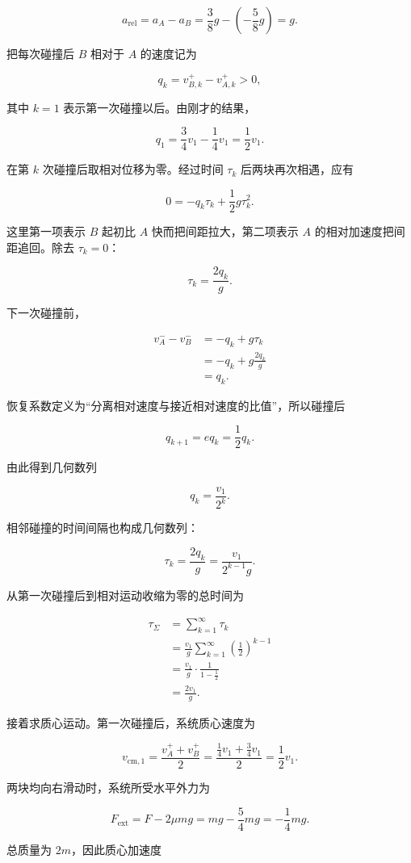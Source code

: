 \documentclass[12pt,a4paper,UTF8]{ctexart}
\begin{document}
\[a_{\mathrm{rel}}=a_A-a_B
=\frac38g-\left(-\frac58g\right)=g.\]

把每次碰撞后 \(B\) 相对于 \(A\) 的速度记为

\[q_k=v_{B,k}^+-v_{A,k}^+>0,\]

其中 \(k=1\) 表示第一次碰撞以后。由刚才的结果，

\[q_1=\frac34v_1-\frac14v_1=\frac12v_1.\]

在第 \(k\) 次碰撞后取相对位移为零。经过时间 \(\tau_k\)
后两块再次相遇，应有

\[0=-q_k\tau_k+\frac12g\tau_k^2.\]

这里第一项表示 \(B\) 起初比 \(A\) 快而把间距拉大，第二项表示 \(A\)
的相对加速度把间距追回。除去 \(\tau_k=0\)：

\[\boxed{\tau_k=\frac{2q_k}{g}}.\]

下一次碰撞前，

\[\begin{aligned}
v_A^--v_B^-
&=-q_k+g\tau_k\\
&=-q_k+g\frac{2q_k}{g}\\
&=q_k.
\end{aligned}\]

恢复系数定义为``分离相对速度与接近相对速度的比值''，所以碰撞后

\[q_{k+1}=e q_k=\frac12q_k.\]

由此得到几何数列

\[q_k=\frac{v_1}{2^k}.\]

相邻碰撞的时间间隔也构成几何数列：

\[\tau_k=\frac{2q_k}{g}
=\frac{v_1}{2^{k-1}g}.\]

从第一次碰撞后到相对运动收缩为零的总时间为

\[\begin{aligned}
\tau_\Sigma
&=\sum_{k=1}^{\infty}\tau_k\\
&=\frac{v_1}{g}
\sum_{k=1}^{\infty}\left(\frac12\right)^{k-1}\\
&=\frac{v_1}{g}\cdot\frac{1}{1-\frac12}\\
&=\frac{2v_1}{g}.
\end{aligned}\]

接着求质心运动。第一次碰撞后，系统质心速度为

\[v_{\mathrm{cm},1}
=\frac{v_A^++v_B^+}{2}
=\frac{\frac14v_1+\frac34v_1}{2}
=\frac12v_1.\]

两块均向右滑动时，系统所受水平外力为

\[F_{\mathrm{ext}}
=F-2\mu mg
=mg-\frac54mg
=-\frac14mg.\]

总质量为 \(2m\)，因此质心加速度
\end{document}

